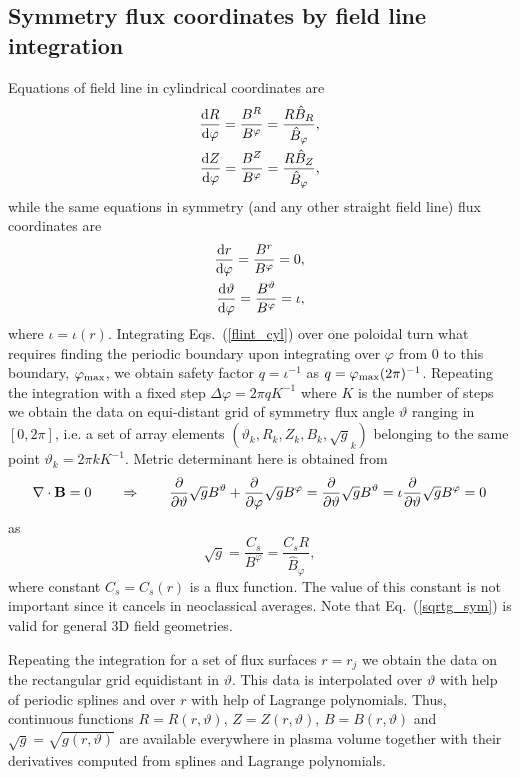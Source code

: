 \documentclass[12pt]{article}
\newcommand{\be}[1]{\begin{equation} \label{#1}}
\newcommand{\ee}{\end{equation}}
\newcommand{\bea}[1]{\begin{eqnarray} \label{#1}}
\newcommand{\eea}{\end{eqnarray}}
\newcommand{\eq}[1]{(\ref{#1})}
\newcommand{\difp}[2]{\frac{\partial #1}{\partial #2}}
\newcommand{\bB}{{\bf B}}
\newcommand{\rd}{{\rm d}}
\begin{document}
\subsection{Symmetry flux coordinates by field line integration}
Equations of field line in cylindrical coordinates are
\bea{flint_cyl}
\frac{\rd R}{\rd \varphi}=\frac{B^R}{B^\varphi}=\frac{R\hat B_R}{\hat B_\varphi},
\nonumber \\
\frac{\rd Z}{\rd \varphi}=\frac{B^Z}{B^\varphi}=\frac{R\hat B_Z}{\hat B_\varphi},
\eea
while the same equations in symmetry (and any other straight field line) flux coordinates are
\bea{flint_sym}
\frac{\rd r}{\rd \varphi}=\frac{B^r}{B^\varphi}=0,
\nonumber \\
\frac{\rd \vartheta}{\rd \varphi}=\frac{B^\vartheta}{B^\varphi}=\iota,
\eea
where $\iota=\iota(r)$. Integrating Eqs.~\eq{flint_cyl} over one poloidal turn what requires finding the periodic boundary 
upon integrating over $\varphi$ from 0 to this boundary, $\varphi_{\rm max}$, we obtain safety factor $q=\iota^{-1}$ as
$q=\varphi_{\rm max}(2\pi)^{-1}$.
Repeating the integration with a fixed step $\Delta\varphi=2\pi q K^{-1}$ where $K$ is the number of steps we obtain
the data on equi-distant grid of symmetry flux angle $\vartheta$ ranging in $[0, 2\pi]$, i.e. a set of array elements
$(\vartheta_k, R_k, Z_k, B_k, \sqrt{g}_k)$ belonging to the same point $\vartheta_k = 2\pi k K^{-1}$.
Metric determinant here is obtained from
\be{divB}
\nabla\cdot\bB=0 \qquad \Rightarrow\qquad \difp{}{\vartheta}\sqrt{g}B^\vartheta + \difp{}{\varphi}\sqrt{g}B^\varphi
=\difp{}{\vartheta}\sqrt{g}B^\vartheta = \iota \difp{}{\vartheta}\sqrt{g}B^\varphi=0
\ee
as
\be{sqrtg_sym}
\sqrt{g} = \frac{C_s}{B^\varphi}=\frac{C_s R}{\hat B_\varphi},
\ee
where constant $C_s=C_s(r)$ is a flux function. The value of this constant is not important since it cancels in neoclassical averages.
Note that Eq.~\eq{sqrtg_sym} is valid for general 3D field geometries.

\noindent
Repeating the integration for a set of flux surfaces $r=r_j$ we obtain the data on the rectangular grid equidistant in $\vartheta$.
This data is interpolated over $\vartheta$ with help of periodic splines and over $r$ with help of Lagrange polynomials.
Thus, continuous functions $R=R(r,\vartheta)$, $Z=Z(r,\vartheta)$, $B=B(r,\vartheta)$ and $\sqrt{g}=\sqrt{g(r,\vartheta)}$
are available everywhere in plasma volume together with their derivatives computed from splines and Lagrange polynomials.
\end{document}
